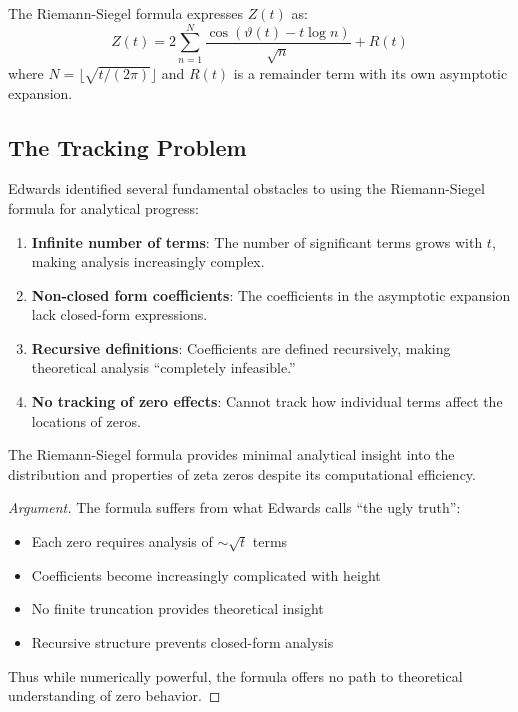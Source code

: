 The Riemann-Siegel formula expresses $Z(t)$ as:
$$Z(t) = 2 \sum_{n=1}^{N} \frac{\cos(\vartheta(t) - t \log n)}{\sqrt{n}} + R(t)$$
where $N = \lfloor \sqrt{t/(2\pi)} \rfloor$ and $R(t)$ is a remainder term with its own asymptotic expansion.

\subsection{The Tracking Problem}

Edwards identified several fundamental obstacles to using the Riemann-Siegel formula for analytical progress:

\begin{enumerate}
\item \textbf{Infinite number of terms}: The number of significant terms grows with $t$, making analysis increasingly complex.

\item \textbf{Non-closed form coefficients}: The coefficients in the asymptotic expansion lack closed-form expressions.

\item \textbf{Recursive definitions}: Coefficients are defined recursively, making theoretical analysis ``completely infeasible.''

\item \textbf{No tracking of zero effects}: Cannot track how individual terms affect the locations of zeros.
\end{enumerate}

\begin{theorem}
The Riemann-Siegel formula provides minimal analytical insight into the distribution and properties of zeta zeros despite its computational efficiency.
\end{theorem}

\begin{proof}[Argument]
The formula suffers from what Edwards calls ``the ugly truth'':
\begin{itemize}
\item Each zero requires analysis of $\sim \sqrt{t}$ terms
\item Coefficients become increasingly complicated with height
\item No finite truncation provides theoretical insight
\item Recursive structure prevents closed-form analysis
\end{itemize}

Thus while numerically powerful, the formula offers no path to theoretical understanding of zero behavior.
\end{proof}

